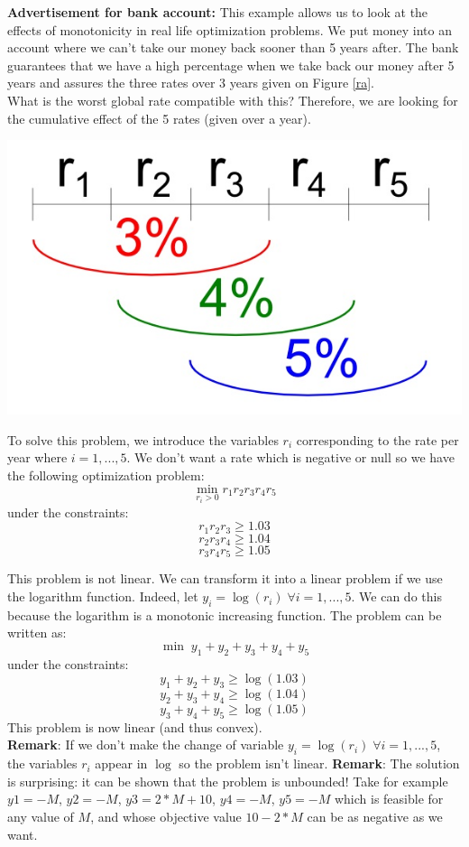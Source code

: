 \begin{example}
\begin{leftbar}
\textbf{Advertisement for bank account:}
This example allows us to look at the effects of monotonicity in real life optimization problems.
We put money into an account where we can't take our money back sooner than 5 years after. The bank guarantees that we have a high percentage when we take back our money after 5 years and assures the three rates over 3 years given on Figure \ref{ra}.\\ 
What is the worst global rate compatible with this? Therefore, we are looking for the cumulative effect of the 5 rates (given over a year). 

\begin{center}
  \includegraphics[scale=0.3]{./images/Course3_rate.jpg}
  \label{ra}
\end{center}

To solve this problem, we introduce the variables $r_i$ corresponding to the rate per year where $i = 1,...,5$. We don't want a rate which is negative or null so we have the following optimization problem:
$$\min \limits _{r_i > 0} r_1r_2r_3r_4r_5 $$
under the constraints: 
$$ r_1r_2r_3 \geq 1.03$$
$$ r_2r_3r_4 \geq 1.04$$
$$ r_3r_4r_5 \geq 1.05$$

This problem is not linear. We can transform it into a linear problem if we use the logarithm function. Indeed, let $y_i = \log(r_i) \; \forall i=1,...,5$. We can do this because the logarithm is a monotonic increasing function. The problem can be written as: 
$$ \min \; y_1 + y_2 + y_3 + y_4 + y_5$$
under the constraints: 
$$ y_1 + y_2 + y_3 \geq \log(1.03)$$
$$ y_2 + y_3 + y_4 \geq \log(1.04)$$
$$ y_3 + y_4 + y_5 \geq \log(1.05)$$
This problem is now linear (and thus convex). \\

\textbf{Remark}: If we don't make the change of variable $y_i = \log(r_i) \; \forall i=1,...,5$,  the variables $r_i$ appear in $\log$ so the problem isn't linear.
\textbf{Remark}: The solution is surprising: it can be shown that the problem is unbounded! Take for example $y1=-M$, $y2=-M$, $y3=2*M+10$, $y4=-M$, $y5=-M$ which is feasible for any value of $M$, and whose objective value $10-2*M$ can be as negative as we want.


\end{leftbar}
\end{example}

